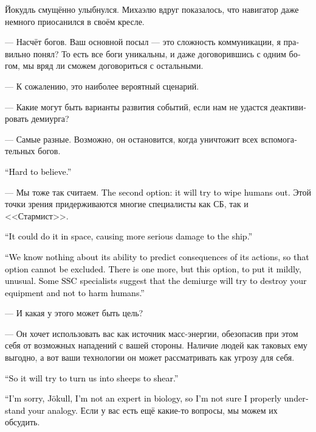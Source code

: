 \documentclass[a4paper,12pt,fleqn]{book}\usepackage{cooltooltips}\usepackage{polyglossia}\setdefaultlanguage[babelshorthands=true]{russian}\setotherlanguage{english}\defaultfontfeatures{Ligatures=TeX,Mapping=tex-text} \usepackage{xcolor}\definecolor{lightgray}{HTML}{bbbbbb}\color{lightgray}\newcommand{\ml}[3]{\textenglish{\textcolor{black}{#3}}}
\begin{document}
Йокудль смущённо улыбнулся.
Михаэлю вдруг показалось, что навигатор даже немного приосанился в своём кресле.

--- Насчёт богов.
Ваш основной посыл --- это сложность коммуникации, я правильно понял?
То есть все боги уникальны, и даже договорившись с одним богом, мы вряд ли сможем договориться с остальными.

--- К сожалению, это наиболее вероятный сценарий.

--- Какие могут быть варианты развития событий, если нам не удастся деактивировать демиурга?

--- Самые разные.
Возможно, он остановится, когда уничтожит всех вспомогательных богов.

\ml{$0$}
{--- Это сомнительно.}
{``Hard to believe.''}

--- Мы тоже так считаем.
\ml{$0$}
{Второй вариант --- он попытается уничтожить людей.}
{The second option: it will try to wipe humans out.}
Этой точки зрения придерживаются многие специалисты как СБ, так и <<Стармист>>.

\ml{$0$}
{--- Он мог уничтожить нас ещё в космосе, нанеся кораблю более значимые повреждения.}
{``It could do it in space, causing more serious damage to the ship.''}

\ml{$0$}
{--- Мы не знаем о том, насколько он способен предсказывать последствия своих действий, поэтому этот вариант исключать нельзя.}
{``We know nothing about its ability to predict consequences of its actions, so that option cannot be excluded.}
\ml{$0$}
{Есть ещё третий вариант, но он, мягко говоря, необычный.}
{There is one more, but this option, to put it mildly, unusual.}
\ml{$0$}
{Некоторые специалисты СБ предполагают, что демиург попытается уничтожить вашу технику, стараясь не причинить вреда людям.}
{Some SSC specialists suggest that the demiurge will try to destroy your equipment and not to harm humans.''}

--- И какая у этого может быть цель?

--- Он хочет использовать вас как источник масс-энергии, обезопасив при этом себя от возможных нападений с вашей стороны.
Наличие людей как таковых ему выгодно, а вот ваши технологии он может рассматривать как угрозу для себя.

\ml{$0$}
{--- То есть из нас делают овечек и собираются стричь.}
{``So it will try to turn us into sheeps to shear.''}

\ml{$0$}
{--- Простите, Йокудль, я не специалист в биологии и не вполне понимаю вашу аналогию.}
{``I'm sorry, Jökull, I'm not an expert in biology, so I'm not sure I properly understand your analogy.}
Если у вас есть ещё какие-то вопросы, мы можем их обсудить.
\end{document}
